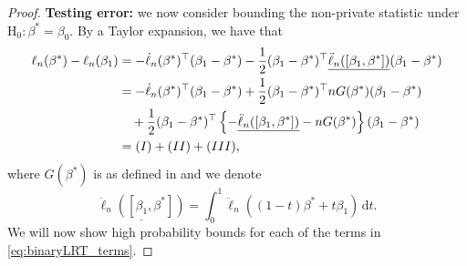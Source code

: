 \documentclass[11pt]{article}
\newcommand{\dint}{\,\mathrm{d}}
\begin{document}
\begin{proof}
\bigskip
\noindent \textbf{Testing error:} we now consider bounding the non-private statistic under $\mathrm{H}_0: \beta^* = \beta_0$. By a Taylor expansion, we have that 
    \begin{align}
     \ell_n(\beta^*) - \ell_n(\beta_1) &= -\dot{\ell}_n(\beta^*)^\top (\beta_1 - \beta^*) - \frac{1}{2}(\beta_1 - \beta^*)^\top \underline{\ddot{\ell}_n([\beta_1, \beta^*])} (\beta_1-\beta^*)     \label{eq:binaryLRT_taylor}
\\
     &= - \dot{\ell}_n(\beta^*)^\top (\beta_1 - \beta^*) + \frac{1}{2}(\beta_1 - \beta^*)^\top nG(\beta^*) (\beta_1 - \beta^*) \notag\\
    &\quad + \frac{1}{2}(\beta_1 - \beta^*)^\top \left\{- \underline{\ddot{\ell}_n([\beta_1, \beta^*])} - nG(\beta^*) \right\}(\beta_1-\beta^*) \notag\\ 
    &= (I) + (II) + (III), \label{eq:binaryLRT_terms}
     \end{align}
where $G(\beta^*)$ is as defined in  and we denote 
\begin{equation*}
    \underline{\ddot{\ell}_n([\beta_1, \beta^*])} = \int_0^1  \ddot{\ell}_n \left((1-t)\beta^* + t\beta_1 \right) \dint t.
\end{equation*}
We will now show high probability bounds for each of the terms in \eqref{eq:binaryLRT_terms}. 


\end{proof}
\end{document}

